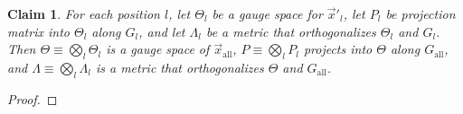 \documentclass{article}
\numberwithin{myclaim}{section}
\newtheorem{claim}{Claim}
\begin{document}
\begin{claim} \label{claim:product_Theta_P_Lambda}
    For each position $l$, let $\Theta_l$ be a gauge space for $\vec{x}'_l$, let $P_l$ be projection matrix into $\Theta_l$ along $G_l$, and let $\Lambda_l$ be a metric that orthogonalizes $\Theta_l$ and $G_l$. Then $\Theta \equiv \bigotimes_l \Theta_l$ is a gauge space of $\vec{x}_\mathrm{all}$, $P \equiv \bigotimes_l P_l$ projects into $\Theta$ along $G_\mathrm{all}$, and $\Lambda \equiv \bigotimes_l \Lambda_l$ is a metric that orthogonalizes $\Theta$ and $G_\mathrm{all}$.
\end{claim}
\begin{proof}


\end{proof}
\end{document}
